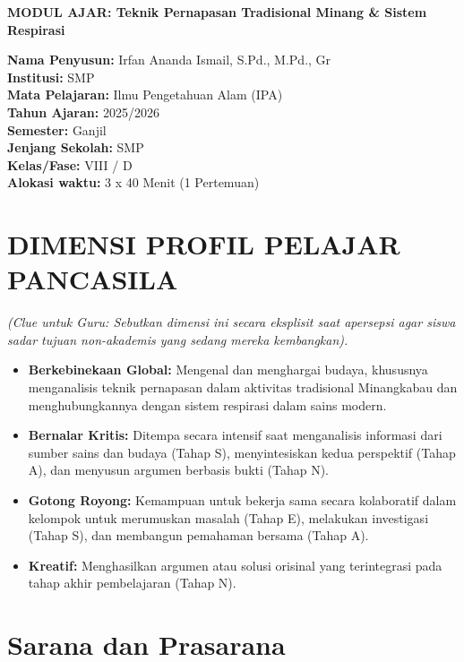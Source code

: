 \documentclass[a4paper,12pt]{article}
\begin{document}
\begin{center}
{\Large\textbf{MODUL AJAR: Teknik Pernapasan Tradisional Minang \& Sistem Respirasi}}
\end{center}

\vspace{0.5cm}

\begin{tcolorbox}[mainbox]
\textbf{Nama Penyusun:} Irfan Ananda Ismail, S.Pd., M.Pd., Gr \\
\textbf{Institusi:} SMP \\
\textbf{Mata Pelajaran:} Ilmu Pengetahuan Alam (IPA) \\
\textbf{Tahun Ajaran:} 2025/2026 \\
\textbf{Semester:} Ganjil \\
\textbf{Jenjang Sekolah:} SMP \\
\textbf{Kelas/Fase:} VIII / D \\
\textbf{Alokasi waktu:} 3 x 40 Menit (1 Pertemuan)
\end{tcolorbox}

\section{DIMENSI PROFIL PELAJAR PANCASILA}
\textit{(Clue untuk Guru: Sebutkan dimensi ini secara eksplisit saat apersepsi agar siswa sadar tujuan non-akademis yang sedang mereka kembangkan).}

\begin{itemize}
\item \textbf{Berkebinekaan Global:} Mengenal dan menghargai budaya, khususnya menganalisis teknik pernapasan dalam aktivitas tradisional Minangkabau dan menghubungkannya dengan sistem respirasi dalam sains modern.
\item \textbf{Bernalar Kritis:} Ditempa secara intensif saat menganalisis informasi dari sumber sains dan budaya (Tahap S), menyintesiskan kedua perspektif (Tahap A), dan menyusun argumen berbasis bukti (Tahap N).
\item \textbf{Gotong Royong:} Kemampuan untuk bekerja sama secara kolaboratif dalam kelompok untuk merumuskan masalah (Tahap E), melakukan investigasi (Tahap S), dan membangun pemahaman bersama (Tahap A).
\item \textbf{Kreatif:} Menghasilkan argumen atau solusi orisinal yang terintegrasi pada tahap akhir pembelajaran (Tahap N).
\end{itemize}

\section{Sarana dan Prasarana}
\end{document}
